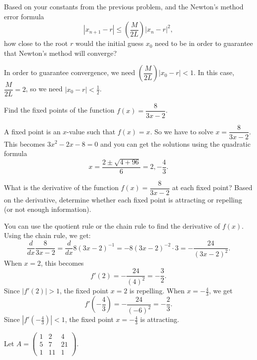 \documentclass[11pt]{exam}
\begin{document}
\begin{questions}
\question Based on your constants from the previous problem, and the Newton's method error formula 
$$|x_{n+1} - r| \le \left( \frac{M}{2L} \right) |x_n - r|^2,$$
how close to the root $r$ would the initial guess $x_0$ need to be in order to guarantee that Newton's method will converge?  
\begin{solution}
In order to guarantee convergence, we need $\left( \dfrac{M}{2L} \right) |x_0 - r| < 1$.  In this case, $\dfrac{M}{2L} = 2$, so we need $|x_0-r| < \frac{1}{2}$. %
\end{solution}


\question Find the fixed points of the function $f(x) = \dfrac{8}{3x-2}$.  
\begin{solution}
A fixed point is an $x$-value such that $f(x) = x$.  So we have to solve $x = \dfrac{8}{3x-2}$.  This becomes $3x^2 - 2x - 8 = 0$ and you can get the solutions using the quadratic formula
$$x = \frac{2 \pm \sqrt{4 + 96}}{6} = 2, -\frac{4}{3}.$$
\end{solution}

\question What is the derivative of the function $f(x) = \dfrac{8}{3x-2}$ at each fixed point?  Based on the derivative, determine whether each fixed point is attracting or repelling (or not enough information).  

\begin{solution}
You can use the quotient rule or the chain rule to find the derivative of $f(x)$.  Using the chain rule, we get:
$$\frac{d}{dx} \dfrac{8}{3x-2} = \frac{d}{dx} 8 (3x-2)^{-1} = -8 (3x-2)^{-2} \cdot 3 = -\frac{24}{(3x-2)^2}.$$
When $x=2$, this becomes
$$f'(2) = -\frac{24}{(4)^2} = -\frac{3}{2}.$$
Since $|f'(2)| > 1$, the fixed point $x=2$ is repelling.
When $x=-\frac{4}{3}$, we get
$$f'(-\frac{4}{3}) = -\frac{24}{(-6)^2} = -\frac{2}{3}.$$
Since $|f'(-\frac{4}{3})| < 1$, the fixed point $x=-\frac{4}{3}$ is attracting. 
\end{solution}

\question Let $A = \begin{pmatrix} 1 & 2 & 4 \\ 5 & 7 & 21 \\ 1 & 11 & 1 \end{pmatrix}.$
\begin{parts}

\end{parts}
\end{questions}
\end{document}

